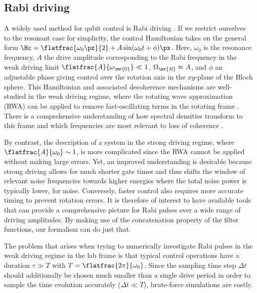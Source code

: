 \subsection{Rabi driving}\label{sec:examples:rabi_driving}
A widely used method for qubit control is Rabi driving \cite{Wallraff2004,Barends2014,Soare2014,Veldhorst2014}. If we restrict ourselves to the resonant case for simplicity, the control Hamiltonian takes on the general form $\Hc = \flatfrac{\omega_0\pz}{2} + A\sin(\omega_0 t + \phi)\px$. Here, $\omega_0$ is the resonance frequency, $A$ the drive amplitude corresponding to the Rabi frequency in the weak driving limit $\flatfrac{A}{\omega_\mr{0}}\ll 1$, $\Omega_\mr{R}\approx A$, and $\phi$ an adjustable phase giving control over the rotation axis in the $xy$-plane of the Bloch sphere. This Hamiltonian and associated decoherence mechanisms are well-studied in the weak driving regime, where the rotating wave approximation (RWA) can be applied to remove fast-oscillating terms in the rotating frame \cite{Jaynes1963,Gerry2005}. There is a comprehensive understanding of how spectral densities transform to this frame and which frequencies are most relevant to loss of coherence \cite{Yan2013}.

By contrast, the description of a system in the strong driving regime, where $\flatfrac{A}{\omega_0}\sim 1$, is more complicated since the RWA cannot be applied without making large errors. Yet, an improved understanding is desirable because strong driving allows for much shorter gate times and thus shifts the window of relevant noise frequencies towards higher energies where the total noise power is typically lower, \eg for \oneoverf noise. Conversely, faster control also requires more accurate timing to prevent rotation errors. It is therefore of interest to have available tools that can provide a comprehensive picture for Rabi pulses over a wide range of driving amplitudes. By making use of the concatenation property of the filter functions, our formalism can do just that.

The problem that arises when trying to numerically investigate Rabi pulses in the weak driving regime in the lab frame is that typical control operations have a duration $\tau\gg T$ with $T = \flatfrac{2\pi}{\omega_0}$. Since the sampling time step $\Delta t$ should additionally be chosen much smaller than a single drive period in order to sample the time evolution accurately ($\Delta t\ll T$), brute-force simulations are costly.

